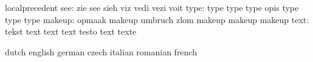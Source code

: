                            localprecedent
                      see: zie                       see
                           sieh                      viz
                           vedi                      vezi
                           voit
                     type: type                      type
                           type                      opis
                           type                      type
                           type
                   makeup: opmaak                    makeup
                           umbruch                   zlom
                           makeup                    makeup
                           makeup
                     text: tekst                     text
                           text                      text
                           testo                     text
                           texte

\stopelements


\startvariables            dutch                     english
                           german                    czech
                           italian                   romanian
                           french

